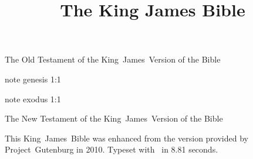 \documentclass[twoside,twocolumn]{bible}
\title{The King James Bible}
\begin{document}
\null
\thispagestyle{empty}
\vfil
\centerline{\Large The Old Testament of the King~James~Version of the Bible}
\vfil
\null



\csname note genesis 1:1\endcsname

\csname note exodus 1:1\endcsname







































\null
\thispagestyle{empty}
\vfil
\centerline{\Large The New Testament of the King~James~Version of the Bible}
\vfil
\null




























\backmatter

This King~James~Bible was enhanced from the version provided by
Project~Gutenburg in 2010.  Typeset with \XeTeX\ in 8.81 seconds.
\end{document}
